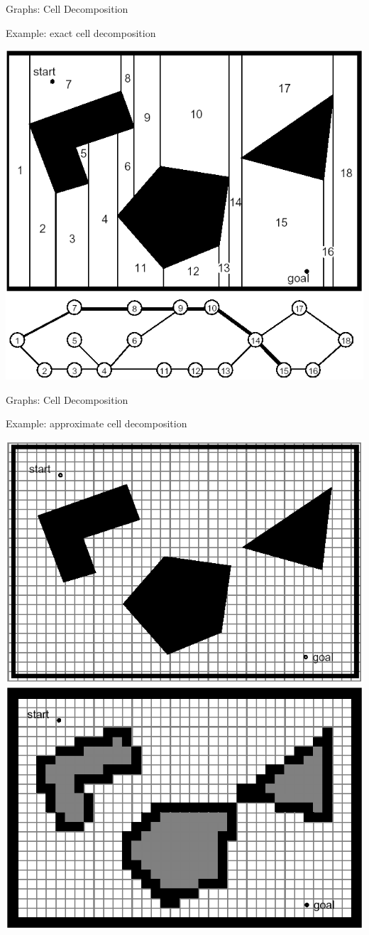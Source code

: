 \documentclass[compress]{beamer}
\begin{document}
\begin{frame}{Graphs: Cell Decomposition}

Example: exact cell decomposition

    \begin{center}
        \includegraphics[width=0.8\linewidth]{exactcelldecomposition}
    \end{center}

\end{frame}

\begin{frame}{Graphs: Cell Decomposition}

Example: approximate cell decomposition

    \begin{center}
        \includegraphics[width=0.4\linewidth]{celldecomposition1}
        \hspace{1em}
        \includegraphics[width=0.4\linewidth]{celldecomposition2}
    \end{center}

\end{frame}
\end{document}
